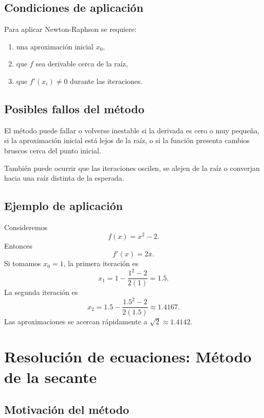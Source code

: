\documentclass[a4,11pt]{aleph-notas}
\begin{document}
\subsection{Condiciones de aplicación}

Para aplicar Newton-Raphson se requiere:
\begin{enumerate}
    \item una aproximación inicial $x_0$,
    \item que $f$ sea derivable cerca de la raíz,
    \item que $f'(x_i)\neq 0$ durante las iteraciones.
\end{enumerate}

\subsection{Posibles fallos del método}

\begin{advertencia}
    El método puede fallar o volverse inestable si la derivada es cero o muy pequeña, si la aproximación inicial está lejos de la raíz, o si la función presenta cambios bruscos cerca del punto inicial.
\end{advertencia}

También puede ocurrir que las iteraciones oscilen, se alejen de la raíz o converjan hacia una raíz distinta de la esperada.

\subsection{Ejemplo de aplicación}

\begin{ejem}
    Consideremos
    \[
        f(x)=x^2-2.
    \]
    Entonces
    \[
        f'(x)=2x.
    \]
    Si tomamos $x_0=1$, la primera iteración es
    \[
        x_1=1-\frac{1^2-2}{2(1)}=1.5.
    \]
    La segunda iteración es
    \[
        x_2=1.5-\frac{1.5^2-2}{2(1.5)}
        \approx 1.4167.
    \]
    Las aproximaciones se acercan rápidamente a $\sqrt{2}\approx 1.4142$.
\end{ejem}

\section{Resolución de ecuaciones: Método de la secante}

\subsection{Motivación del método}
\end{document}

